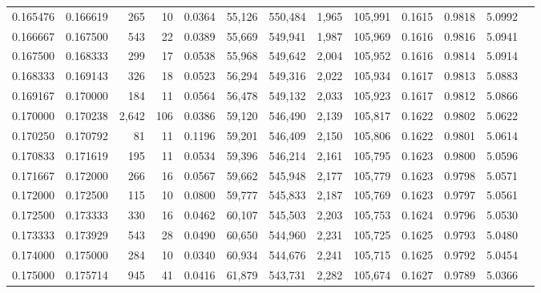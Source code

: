 \begin{tabular}{rrrrrrrrrrrrr}
0.165476 & 0.166619 &   265 &  10 &                                     0.0364 &  55,126 & 550,484 &   1,965 & 105,991 & 0.1615 & 0.9818 & 5.0992 \\
0.166667 & 0.167500 &   543 &  22 &                                     0.0389 &  55,669 & 549,941 &   1,987 & 105,969 & 0.1616 & 0.9816 & 5.0941 \\
0.167500 & 0.168333 &   299 &  17 &                                     0.0538 &  55,968 & 549,642 &   2,004 & 105,952 & 0.1616 & 0.9814 & 5.0914 \\
0.168333 & 0.169143 &   326 &  18 &                                     0.0523 &  56,294 & 549,316 &   2,022 & 105,934 & 0.1617 & 0.9813 & 5.0883 \\
0.169167 & 0.170000 &   184 &  11 &                                     0.0564 &  56,478 & 549,132 &   2,033 & 105,923 & 0.1617 & 0.9812 & 5.0866 \\
0.170000 & 0.170238 & 2,642 & 106 &                                     0.0386 &  59,120 & 546,490 &   2,139 & 105,817 & 0.1622 & 0.9802 & 5.0622 \\
0.170250 & 0.170792 &    81 &  11 &                                     0.1196 &  59,201 & 546,409 &   2,150 & 105,806 & 0.1622 & 0.9801 & 5.0614 \\
0.170833 & 0.171619 &   195 &  11 &                                     0.0534 &  59,396 & 546,214 &   2,161 & 105,795 & 0.1623 & 0.9800 & 5.0596 \\
0.171667 & 0.172000 &   266 &  16 &                                     0.0567 &  59,662 & 545,948 &   2,177 & 105,779 & 0.1623 & 0.9798 & 5.0571 \\
0.172000 & 0.172500 &   115 &  10 &                                     0.0800 &  59,777 & 545,833 &   2,187 & 105,769 & 0.1623 & 0.9797 & 5.0561 \\
0.172500 & 0.173333 &   330 &  16 &                                     0.0462 &  60,107 & 545,503 &   2,203 & 105,753 & 0.1624 & 0.9796 & 5.0530 \\
0.173333 & 0.173929 &   543 &  28 &                                     0.0490 &  60,650 & 544,960 &   2,231 & 105,725 & 0.1625 & 0.9793 & 5.0480 \\
0.174000 & 0.175000 &   284 &  10 &                                     0.0340 &  60,934 & 544,676 &   2,241 & 105,715 & 0.1625 & 0.9792 & 5.0454 \\
0.175000 & 0.175714 &   945 &  41 &                                     0.0416 &  61,879 & 543,731 &   2,282 & 105,674 & 0.1627 & 0.9789 & 5.0366 \\

\end{tabular}
